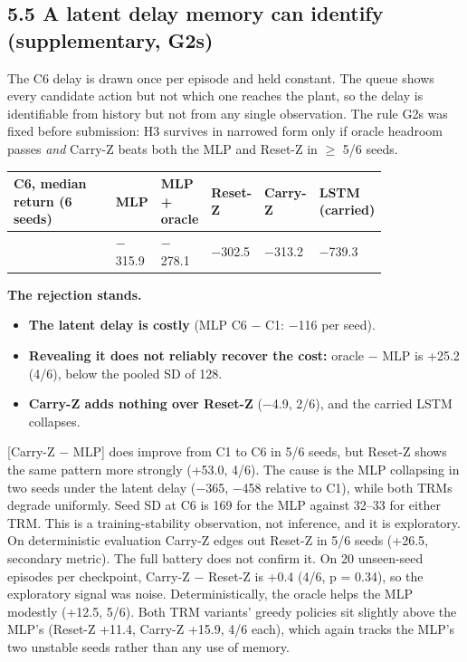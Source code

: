 \documentclass[11pt]{article}
\begin{document}
\subsection*{5.5 A latent delay memory can identify (supplementary, G2s)}



The C6 delay is drawn once per episode and held constant. The queue shows every candidate action but not which one reaches the plant, so the delay is identifiable from history but not from any single observation. The rule G2s was fixed before submission: H3 survives in narrowed form only if oracle headroom passes \emph{and} Carry-Z beats both the MLP and Reset-Z in $\geq$ 5/6 seeds.



\begin{center}\small\begin{tabular}{>{\raggedright\arraybackslash}p{0.301\linewidth}>{\raggedleft\arraybackslash}p{0.069\linewidth}>{\raggedleft\arraybackslash}p{0.134\linewidth}>{\raggedleft\arraybackslash}p{0.081\linewidth}>{\raggedleft\arraybackslash}p{0.081\linewidth}>{\raggedleft\arraybackslash}p{0.157\linewidth}}
\toprule
C6, median return (6 seeds) & MLP & MLP + oracle & Reset-Z & Carry-Z & LSTM (carried) \\
\midrule
 & $-$315.9 & $-$278.1 & $-$302.5 & $-$313.2 & $-$739.3 \\
\bottomrule
\end{tabular}\end{center}



\textbf{The rejection stands.}

\begin{itemize}
\item \textbf{The latent delay is costly} (MLP C6 $-$ C1: $-$116 per seed).
\item \textbf{Revealing it does not reliably recover the cost:} oracle $-$ MLP is +25.2 (4/6), below the pooled SD of 128.
\item \textbf{Carry-Z adds nothing over Reset-Z} ($-$4.9, 2/6), and the carried LSTM collapses.
\end{itemize}



[Carry-Z $-$ MLP] does improve from C1 to C6 in 5/6 seeds, but Reset-Z shows the same pattern more strongly (+53.0, 4/6). The cause is the MLP collapsing in two seeds under the latent delay ($-$365, $-$458 relative to C1), while both TRMs degrade uniformly. Seed SD at C6 is 169 for the MLP against 32--33 for either TRM. This is a training-stability observation, not inference, and it is exploratory. On deterministic evaluation Carry-Z edges out Reset-Z in 5/6 seeds (+26.5, secondary metric). The full battery does not confirm it. On 20 unseen-seed episodes per checkpoint, Carry-Z $-$ Reset-Z is +0.4 (4/6, p = 0.34), so the exploratory signal was noise. Deterministically, the oracle helps the MLP modestly (+12.5, 5/6). Both TRM variants' greedy policies sit slightly above the MLP's (Reset-Z +11.4, Carry-Z +15.9, 4/6 each), which again tracks the MLP's two unstable seeds rather than any use of memory.
\end{document}
